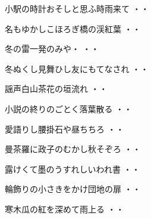\vspace{0.6cm}
\begin{shiika}小駅の時計おそしと思ふ時雨来て
\hfill{・・}\end{shiika}
\vspace{0.6cm}
\begin{shiika}名もゆかしこほろぎ橋の渓紅葉
\hfill{・・}\end{shiika}
\vspace{0.6cm}
\begin{shiika}冬の雷一発のみや・
\hfill{・・}\end{shiika}
\vspace{0.6cm}
\begin{shiika}冬ぬくし見舞ひし友にもてなされ
\hfill{・・}\end{shiika}
\vspace{0.6cm}
\begin{shiika}謡声白山茶花の垣流れ
\hfill{・・}\end{shiika}
\vspace{0.6cm}
\begin{shiika}小説の終りのごとく落葉散る
\hfill{・・}\end{shiika}
\vspace{0.6cm}
\begin{shiika}愛語りし腰掛石や昼ちちろ
\hfill{・・}\end{shiika}
\vspace{0.6cm}
\begin{shiika}曼茶羅に政子のむかし秋そぞろ
\hfill{・・}\end{shiika}
\vspace{0.6cm}
\begin{shiika}露けくて墨のうすれしいわれ書
\hfill{・・}\end{shiika}
\vspace{0.6cm}
\begin{shiika}輪飾りの小さきをかけ団地の扉
\hfill{・・}\end{shiika}
\vspace{0.6cm}
\begin{shiika}寒木瓜の紅を深めて雨上る
\hfill{・・}\end{shiika}

